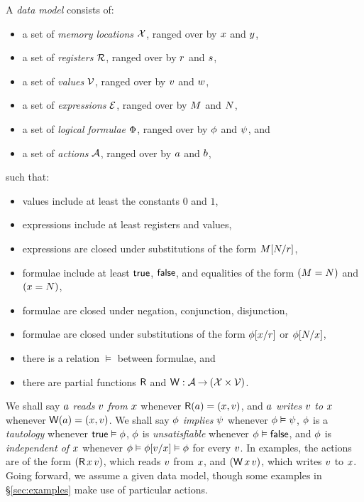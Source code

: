 A \emph{data model} consists of:
\begin{itemize}
\item a set of \emph{memory locations} $\mathcal{X}$, ranged over by
  $x$ and $y$,
\item a set of \emph{registers} $\mathcal{R}$, ranged over by
  $r$ and $s$,
\item a set of \emph{values} $\mathcal{V}$, ranged over by
  $v$ and $w$,
\item a set of \emph{expressions} $\mathcal{E}$, ranged over by
  $M$ and $N$,
\item a set of \emph{logical formulae} $\Phi$, ranged over by
  $\phi$ and $\psi$, and
\item a set of \emph{actions} $\mathcal{A}$, ranged over by $a$ and $b$,
\end{itemize}
such that:
\begin{itemize}
\item values include at least the constants $0$ and $1$,
\item expressions include at least registers and values,
\item expressions are closed under substitutions of the form $M[N/r]$,
\item formulae include at least $\mathsf{true}$, $\mathsf{false}$, and equalities of the form $(M=N)$ and $(x=N)$,
\item formulae are closed under negation, conjunction, disjunction,
\item formulae are closed under substitutions of the form $\phi[x/r]$ or $\phi[N/x]$,
\item there is a relation $\vDash$ between formulae, and
\item there are partial functions $\mathsf{R}$ and $\mathsf{W}: \mathcal{A} \mathbin\rightarrow (\mathcal{X} \times \mathcal{V})$.
\end{itemize}
We shall say $a$ \emph{reads} $v$ \emph{from} $x$ whenever
$\mathsf{R}(a) = (x,v)$, and
$a$ \emph{writes} $v$ \emph{to} $x$ whenever
$\mathsf{W}(a) = (x,v)$.
We shall say $\phi$ \emph{implies} $\psi$ whenever $\phi\vDash\psi$,
$\phi$ is a \emph{tautology} whenever $\mathsf{true}\vDash\phi$,
$\phi$ is \emph{unsatisfiable} whenever $\phi\vDash\mathsf{false}$, and
$\phi$ is \emph{independent of $x$} whenever $\phi \vDash \phi[v/x] \vDash \phi$ for every $v$.
In examples, the actions are of the form $(\DR{\aLoc}{\aVal})$, which reads $v$ from $x$,
and $(\DW{\aLoc}{\aVal})$, which writes $v$ to $x$.
Going forward, we assume a given data model, though some examples in
\S\ref{sec:examples} make use of particular actions.

